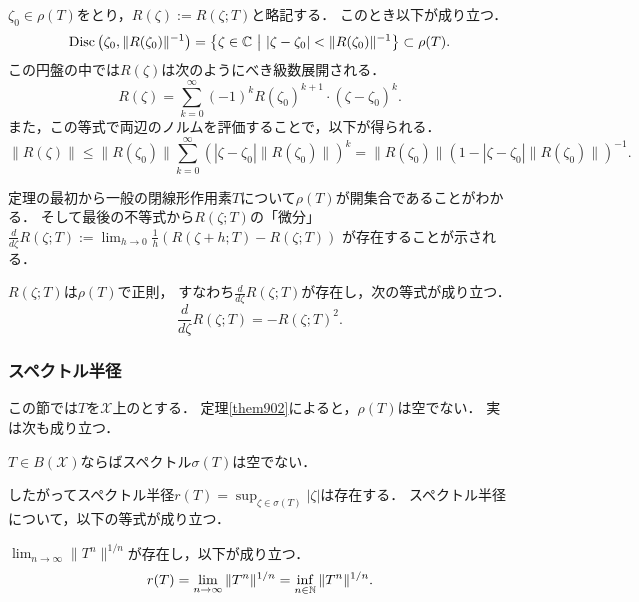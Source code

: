 \documentclass[a4j]{jsarticle}
\newcommand{\spX}{\mathscr{X}}
\begin{document}
    \begin{Thm}[定理9.5, p.211]
        $\zeta_0 \in \rho(T)$をとり，$R(\zeta):=R(\zeta;T)$と略記する．
        このとき以下が成り立つ．
        \[
            \mathrm{Disc} \left(\zeta_0, \|R(\zeta_0)\|^{-1} \right)
            =\left\{ \zeta \in \mathbb{C} ~\middle|~ |\zeta-\zeta_0|<\|R(\zeta_0)\|^{-1} \right\}
            \subset \rho(T).
        \]
        この円盤の中では$R(\zeta)$は次のようにべき級数展開される．
        \[ R(\zeta)=\sum_{k=0}^{\infty} (-1)^kR(\zeta_0)^{k+1} \cdot (\zeta-\zeta_0)^k. \]
        また，この等式で両辺のノルムを評価することで，以下が得られる．
        \[
            \|R(\zeta)\|
            \leq \|R(\zeta_0)\| \sum_{k=0}^{\infty}\left( |\zeta-\zeta_0|\|R(\zeta_0)\| \right)^k
            =\|R(\zeta_0)\| (1-|\zeta-\zeta_0|\|R(\zeta_0)\|)^{-1}.
        \]
    \end{Thm}
    定理の最初から一般の閉線形作用素$T$について$\rho(T)$が開集合であることがわかる．
    そして最後の不等式から$R(\zeta;T)$の「微分」$\frac{d}{d \zeta}R(\zeta;T):=\lim_{h \to 0}\frac{1}{h} (R(\zeta+h;T)-R(\zeta;T))$
    が存在することが示される．

    \begin{Thm}[定理9.6, p.212]
        $R(\zeta;T)$は$\rho(T)$で正則，
        すなわち$\frac{d}{d \zeta}R(\zeta;T)$が存在し，次の等式が成り立つ．
        \[ \frac{d}{d \zeta}R(\zeta;T)=-R(\zeta;T)^2. \]
    \end{Thm}

    \subsubsection{スペクトル半径}
    この節では$T$を$\spX$上のとする．
    定理\ref{them902}によると，$\rho(T)$は空でない．
    実は次も成り立つ．
    \begin{Thm}[定理9.8, p.213]
        $T \in B(\spX)$ならばスペクトル$\sigma(T)$は空でない．
    \end{Thm}
    したがってスペクトル半径$r(T)=\sup_{\zeta \in \sigma(T)}|\zeta|$は存在する．
    スペクトル半径について，以下の等式が成り立つ．
    \begin{Thm}[定理9.12, p.215] \label{them912}
        $\lim_{n \to \infty} \|T^n\|^{1/n}$が存在し，以下が成り立つ．
        \[ r(T)=\lim_{n \to \infty} \|T^n\|^{1/n}=\inf_{n \in \mathbb{N}} \|T^n\|^{1/n}. \]
    \end{Thm}
\end{document}
